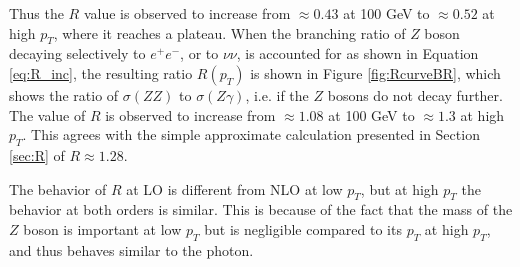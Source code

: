 \documentclass[11pt,a4paper,openright,twoside]{report}
\begin{document}
Thus the $R$ value is observed to increase from $\approx 0.43$ at 100 GeV to $\approx 0.52$ at high $p_T$, where it reaches a plateau. When the branching ratio of $Z$ boson decaying selectively to $e^+e^-$, or to $\nu\nu$, is accounted for as shown in Equation \ref{eq:R_inc}, the resulting ratio $R(p_T)$ is shown in Figure \ref{fig:RcurveBR}, which shows the ratio of $\sigma(ZZ)$ to $\sigma(Z\gamma)$, i.e. if the $Z$ bosons do not decay further. The value of $R$ is observed to increase from $\approx 1.08$ at 100 GeV to $\approx 1.3$ at high $p_T$. This agrees with the simple approximate calculation presented in Section \ref{sec:R} of $R \approx 1.28$.

The behavior of $R$ at LO is different from NLO at low $p_T$, but at high $p_T$ the behavior at both orders is similar. This is because of the fact that the mass of the $Z$ boson is important at low $p_T$ but is negligible compared to its $p_T$ at high $p_T$, and thus behaves similar to the photon.
\end{document}
